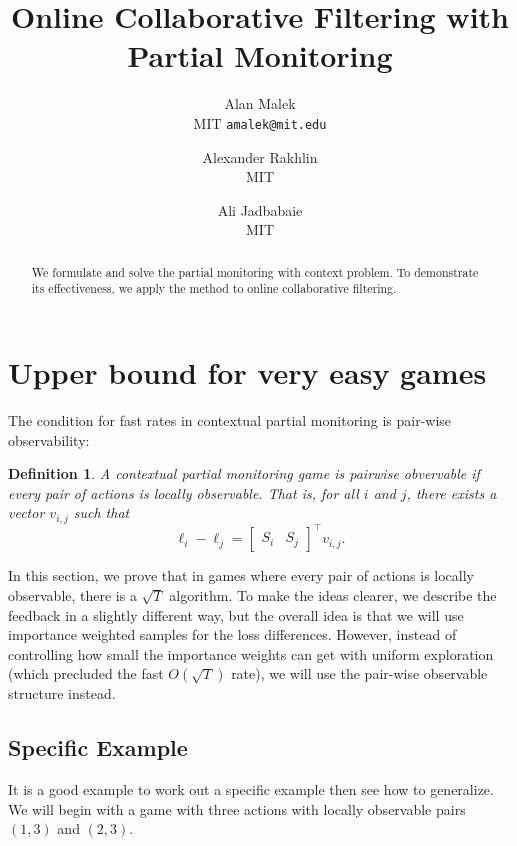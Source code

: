\documentclass[11pt]{article}
\newtheorem{definition}{Definition}
\begin{document}
\title{Online Collaborative Filtering with Partial Monitoring}

\author{
  Alan Malek
  \\MIT
  \texttt{amalek@mit.edu}
  \and
  Alexander Rakhlin
  \\MIT
  \and
  Ali Jadbabaie\\
  MIT
}

\begin{abstract}
We formulate and solve the partial monitoring with context problem. To demonstrate its effectiveness, we apply the method to online collaborative filtering.
\end{abstract}



\section{Upper bound for very easy games}

The condition for fast rates in contextual partial monitoring is pair-wise observability:
\begin{definition}
  A contextual partial monitoring game is pairwise obvervable if every pair of actions is locally observable. That is, for all $i$ and $j$, there exists a vector $v_{i,j}$ such that 
  \[
    \ell_i - \ell_j =
    \begin{bmatrix}
    S_i & S_j 
    \end{bmatrix}^\top 
    v_{i,j}.
  \]
\end{definition}

In this section, we prove that in games where every pair of actions is locally observable, there is a $\sqrt{T}$ algorithm. To make the ideas clearer, we describe the feedback in a slightly different way, but the overall idea is that we will use importance weighted samples for the loss differences. However, instead of controlling how small the importance weights can get with uniform exploration (which precluded the fast $O(\sqrt{T})$ rate), we will use the pair-wise observable structure instead.



  
\subsection{Specific Example}
It is a good example to work out a specific example then see how to generalize. We will begin with a game with three actions with locally observable pairs $(1,3)$ and $(2,3)$.
\end{document}
